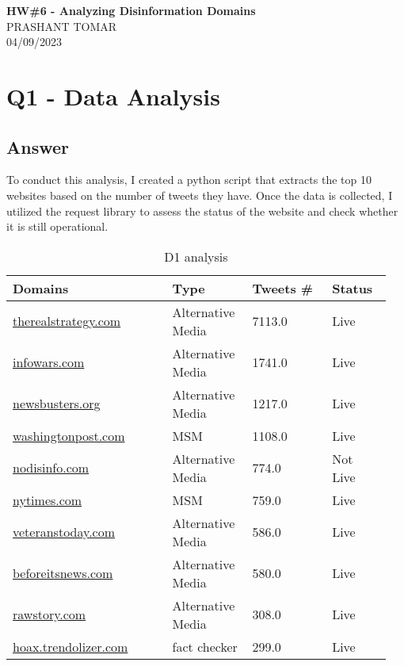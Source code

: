 \documentclass[12pt]{article}
\begin{document}
\begin{centering}
{\large\textbf{HW\#6 - Analyzing Disinformation Domains }}\\ %
PRASHANT TOMAR\\                     %
04/09/2023\\                      %
\end{centering}


\section*{Q1 - Data Analysis}

\subsection*{Answer}
To conduct this analysis, I created a python script that extracts the top 10 websites based on the number of tweets they have. Once the data is collected, I utilized the request library to assess the status of the website and check whether it is still operational.
\\
\begin{table}[h]
\centering
\caption{D1 analysis}
\label{tbl:simple}
\begin{tabular}{p{0.40\linewidth}p{0.20\linewidth}p{0.20\linewidth}p{0.15\linewidth}}
\hline
\textbf{Domains} & \textbf{Type} & \textbf{Tweets #} & \textbf{Status} \\ \hline \hline
\url{therealstrategy.com} & Alternative Media & 7113.0 & Live \\ \hline
\url{infowars.com} & Alternative Media & 1741.0 & Live \\ \hline
\url{newsbusters.org} & Alternative Media & 1217.0 & Live \\ \hline
\url{washingtonpost.com} & MSM & 1108.0 & Live \\ \hline
\url{nodisinfo.com} & Alternative Media & 774.0 & Not Live \\ \hline
\url{nytimes.com} & MSM & 759.0 & Live \\ \hline
\url{veteranstoday.com} & Alternative Media & 586.0 & Live \\ \hline
\url{beforeitsnews.com} & Alternative Media & 580.0 & Live \\ \hline
\url{rawstory.com} & Alternative Media & 308.0 & Live \\ \hline
\url{hoax.trendolizer.com} & fact checker & 299.0 & Live \\ \hline \hline

\end{tabular}
\end{table}
\end{document}
